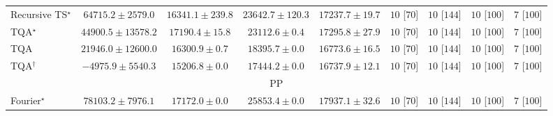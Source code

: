\begin{tabular}{l|cccc|cccc|}
Recursive TS$^\star$ & {\cellcolor[HTML]{B44103}} \color[HTML]{F1F1F1} $64715.2\pm 2579.0$ & {\cellcolor[HTML]{FEE392}} \color[HTML]{000000} $16341.1\pm 239.8$ & {\cellcolor[HTML]{FECF67}} \color[HTML]{000000} $23642.7\pm 120.3$ & {\cellcolor[HTML]{FEE28E}} \color[HTML]{000000} $17237.7\pm 19.7$ & {\cellcolor[HTML]{49006A}} \color[HTML]{F1F1F1} $10$ [$70$] & {\cellcolor[HTML]{49006A}} \color[HTML]{F1F1F1} $10$ [$144$] & {\cellcolor[HTML]{49006A}} \color[HTML]{F1F1F1} $10$ [$100$] & {\cellcolor[HTML]{FFF7F3}} \color[HTML]{000000} $7$ [$100$] \\
TQA$^\star$ & {\cellcolor[HTML]{F3801C}} \color[HTML]{F1F1F1} $44900.5\pm 13578.2$ & {\cellcolor[HTML]{FEE28E}} \color[HTML]{000000} $17190.4\pm 15.8$ & {\cellcolor[HTML]{FED069}} \color[HTML]{000000} $23112.6\pm 0.4$ & {\cellcolor[HTML]{FEE18C}} \color[HTML]{000000} $17295.8\pm 27.9$ & {\cellcolor[HTML]{49006A}} \color[HTML]{F1F1F1} $10$ [$70$] & {\cellcolor[HTML]{49006A}} \color[HTML]{F1F1F1} $10$ [$144$] & {\cellcolor[HTML]{49006A}} \color[HTML]{F1F1F1} $10$ [$100$] & {\cellcolor[HTML]{FFF7F3}} \color[HTML]{000000} $7$ [$100$] \\
TQA & {\cellcolor[HTML]{FED471}} \color[HTML]{000000} $21946.0\pm 12600.0$ & {\cellcolor[HTML]{FEE392}} \color[HTML]{000000} $16300.9\pm 0.7$ & {\cellcolor[HTML]{FEDE86}} \color[HTML]{000000} $18395.7\pm 0.0$ & {\cellcolor[HTML]{FEE390}} \color[HTML]{000000} $16773.6\pm 16.5$ & {\cellcolor[HTML]{49006A}} \color[HTML]{F1F1F1} $10$ [$70$] & {\cellcolor[HTML]{49006A}} \color[HTML]{F1F1F1} $10$ [$144$] & {\cellcolor[HTML]{49006A}} \color[HTML]{F1F1F1} $10$ [$100$] & {\cellcolor[HTML]{FFF7F3}} \color[HTML]{000000} $7$ [$100$] \\
TQA$^\dagger$ & {\cellcolor[HTML]{FFFFE5}} \color[HTML]{000000} $-4975.9\pm 5540.3$ & {\cellcolor[HTML]{FEE697}} \color[HTML]{000000} $15206.8\pm 0.0$ & {\cellcolor[HTML]{FEE18C}} \color[HTML]{000000} $17444.2\pm 0.0$ & {\cellcolor[HTML]{FEE390}} \color[HTML]{000000} $16737.9\pm 12.1$ & {\cellcolor[HTML]{49006A}} \color[HTML]{F1F1F1} $10$ [$70$] & {\cellcolor[HTML]{49006A}} \color[HTML]{F1F1F1} $10$ [$144$] & {\cellcolor[HTML]{49006A}} \color[HTML]{F1F1F1} $10$ [$100$] & {\cellcolor[HTML]{FFF7F3}} \color[HTML]{000000} $7$ [$100$] \\
\cline{1-9}
\multicolumn{9}{c}{\rule{0pt}{8pt}PP} \\
\midrule
Fourier$^\star$ & {\cellcolor[HTML]{004F2D}} \color[HTML]{F1F1F1} $78103.2\pm 7976.1$ & {\cellcolor[HTML]{D7EFA2}} \color[HTML]{000000} $17172.0\pm 0.0$ & {\cellcolor[HTML]{B3E091}} \color[HTML]{000000} $25853.4\pm 0.0$ & {\cellcolor[HTML]{D5EEA1}} \color[HTML]{000000} $17937.1\pm 32.6$ & {\cellcolor[HTML]{49006A}} \color[HTML]{F1F1F1} $10$ [$70$] & {\cellcolor[HTML]{49006A}} \color[HTML]{F1F1F1} $10$ [$144$] & {\cellcolor[HTML]{49006A}} \color[HTML]{F1F1F1} $10$ [$100$] & {\cellcolor[HTML]{FFF7F3}} \color[HTML]{000000} $7$ [$100$] \\

\end{tabular}
